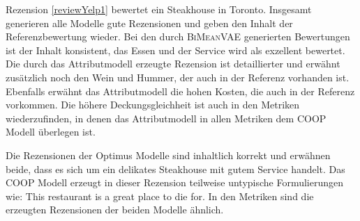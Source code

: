 Rezension \ref{reviewYelp1} bewertet ein Steakhouse in Toronto. 
Insgesamt generieren alle Modelle gute Rezensionen und geben den Inhalt der Referenzbewertung wieder. 
Bei den durch \textsc{BiMeanVAE} generierten Bewertungen ist der Inhalt konsistent, das Essen und der Service wird als exzellent bewertet.
Die durch das Attributmodell erzeugte Rezension ist detaillierter und erwähnt zusätzlich noch den Wein und Hummer, der auch in der Referenz vorhanden ist. Ebenfalls erwähnt das Attributmodell die hohen Kosten, die auch in der Referenz vorkommen.
Die höhere Deckungsgleichheit ist auch in den Metriken wiederzufinden, in denen das Attributmodell in allen Metriken dem COOP Modell überlegen ist. 

Die Rezensionen der Optimus Modelle sind inhaltlich korrekt und erwähnen beide, dass es sich um ein delikates Steakhouse mit gutem Service handelt.
Das COOP Modell erzeugt in dieser Rezension teilweise untypische Formulierungen wie: \glqq{}This restaurant is a great place to die for\grqq{}.
In den Metriken sind die erzeugten Rezensionen der beiden Modelle ähnlich.

